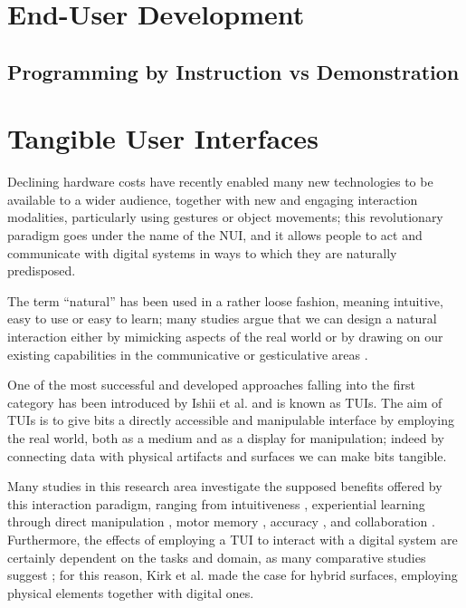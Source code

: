 \section{End-User Development}

\subsection{Programming by Instruction vs Demonstration}

\section{Tangible User Interfaces}
Declining hardware costs have recently enabled many new technologies to be available to a wider audience, together with new and engaging interaction modalities, particularly using gestures or object movements; this revolutionary paradigm goes under the name of the \ac{NUI}, and it allows people to act and communicate with digital systems in ways to which they are naturally predisposed.

The term ``natural'' has been used in a rather loose fashion, meaning intuitive, easy to use or easy to learn; many studies argue that we can design a natural interaction either by mimicking aspects of the real world \cite{Jacob:2008dj} or by drawing on our existing capabilities in the communicative or gesticulative areas \cite{Wigdor:2011:BNW:1995309}.

One of the most successful and developed approaches falling into the first category has been introduced by Ishii et al. \cite{Ishii:1997gy} and is known as \acp{TUI}. The aim of \acp{TUI} is to give bits a directly accessible and manipulable interface by employing the real world, both as a medium and as a display for manipulation; indeed by connecting data with physical artifacts and surfaces we can make bits tangible. 

Many studies in this research area investigate the supposed benefits offered by this interaction paradigm, ranging from intuitiveness \cite{Ishii:1997gy}, experiential learning through direct manipulation \cite{Manches:2009kg, Parkes:2008bu}, motor memory \cite{Weiss:2009ct}, accuracy \cite{Muller:2014kx}, and collaboration \cite{Subramanian:2007kx}. Furthermore, the effects of employing a \ac{TUI} to interact with a digital system are certainly dependent on the tasks and domain, as many comparative studies suggest \cite{Weiss:2009ct, Muller:2014kx, Hancock:2009bg}; for this reason, Kirk et al. \cite{Kirk:2009ue} made the case for hybrid surfaces, employing physical elements together with digital ones.

